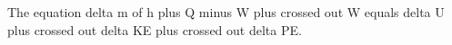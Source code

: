 The equation delta m of h plus Q minus W plus crossed out W equals delta U plus crossed out delta KE plus crossed out delta PE.